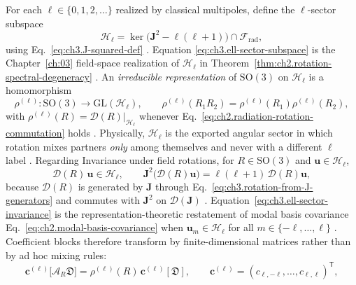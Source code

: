 For each \(\ell\in\{0,1,2,\ldots\}\) realized by classical multipoles, define the
\(\ell\)-sector subspace
\begin{equation}
\label{eq:ch3.ell-sector-subspace}
\mathcal{H}_{\ell}
=
\ker\big(\mathbf{J}^{2}-\ell(\ell+1)\big)\cap\mathcal{F}_{\mathrm{rad}},
\end{equation}
using Eq.~\eqref{eq:ch3.J-squared-def} \cite{jackson1999}. Equation
\eqref{eq:ch3.ell-sector-subspace} is the Chapter~\ref{ch:03} field-space realization of
\(\mathcal{H}_{\ell}\) in Theorem~\ref{thm:ch2.rotation-spectral-degeneracy}
\cite{stratton1941}. An \emph{irreducible representation} of \(\mathrm{SO}(3)\) on
\(\mathcal{H}_{\ell}\) is a homomorphism
\begin{equation}
\label{eq:ch3.SO3-irrep-homomorphism}
\rho^{(\ell)}:\mathrm{SO}(3)\longrightarrow \mathrm{GL}(\mathcal{H}_{\ell}),
\qquad
\rho^{(\ell)}(R_1R_2)=\rho^{(\ell)}(R_1)\rho^{(\ell)}(R_2),
\end{equation}
with \(\rho^{(\ell)}(R)=\mathcal{D}(R)\big|_{\mathcal{H}_{\ell}}\) whenever
Eq.~\eqref{eq:ch2.radiation-rotation-commutation} holds \cite{jackson1999}. Physically,
\(\mathcal{H}_{\ell}\) is the exported angular sector in which rotation mixes partners \emph{only}
among themselves and never with a different \(\ell\) label \cite{hansen1988}.
Regarding Invariance under field rotations, for \(R\in\mathrm{SO}(3)\) and \(\mathbf{u}\in\mathcal{H}_{\ell}\),
\begin{equation}
\label{eq:ch3.ell-sector-invariance}
\mathcal{D}(R)\,\mathbf{u}\in\mathcal{H}_{\ell},
\qquad
\mathbf{J}^{2}\big(\mathcal{D}(R)\mathbf{u}\big)
=
\ell(\ell+1)\,\mathcal{D}(R)\mathbf{u},
\end{equation}
because \(\mathcal{D}(R)\) is generated by \(\mathbf{J}\) through
Eq.~\eqref{eq:ch3.rotation-from-J-generators} and commutes with \(\mathbf{J}^{2}\) on
\(\mathcal{D}(\mathbf{J})\) \cite{jackson1999}. Equation~\eqref{eq:ch3.ell-sector-invariance}
is the representation-theoretic restatement of modal basis covariance
Eq.~\eqref{eq:ch2.modal-basis-covariance} when \(\mathbf{u}_m\in\mathcal{H}_{\ell}\) for all
\(m\in\{-\ell,\ldots,\ell\}\) \cite{harrington2001}. Coefficient blocks therefore transform
by finite-dimensional matrices rather than by ad hoc mixing rules:
\begin{equation}
\label{eq:ch3.ell-block-coefficient-rotation}
\mathbf{c}^{(\ell)}\big[\mathcal{A}_R\mathfrak{D}\big]
=
\rho^{(\ell)}(R)\,\mathbf{c}^{(\ell)}[\mathfrak{D}],
\qquad
\mathbf{c}^{(\ell)}=(c_{\ell,-\ell},\ldots,c_{\ell,\ell})^{\mathsf{T}},
\end{equation}
